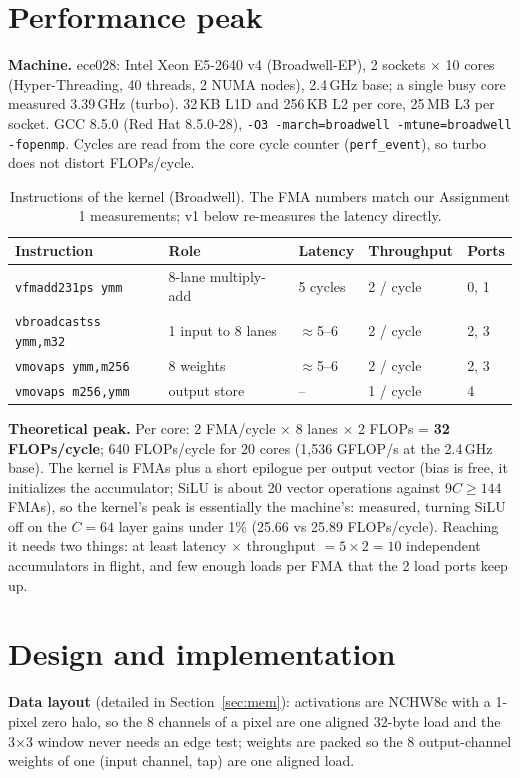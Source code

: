 \documentclass[10pt]{article}
\newcommand{\code}[1]{\texttt{#1}}
\begin{document}
\section{Performance peak}
\textbf{Machine.} ece028: Intel Xeon E5-2640 v4 (Broadwell-EP), 2 sockets $\times$ 10 cores (Hyper-Threading, 40 threads, 2 NUMA nodes), 2.4\,GHz base; a single busy core measured 3.39\,GHz (turbo). 32\,KB L1D and 256\,KB L2 per core, 25\,MB L3 per socket. GCC 8.5.0 (Red Hat 8.5.0-28), \code{-O3 -march=broadwell -mtune=broadwell -fopenmp}. Cycles are read from the core cycle counter (\code{perf\_event}), so turbo does not distort FLOPs/cycle.

\begin{table}[H]\centering\small
\begin{tabular}{lllll}
\toprule
Instruction & Role & Latency & Throughput & Ports\\
\midrule
\code{vfmadd231ps ymm} & 8-lane multiply-add & 5 cycles & 2 / cycle & 0, 1\\
\code{vbroadcastss ymm,m32} & 1 input to 8 lanes & $\approx$5--6 & 2 / cycle & 2, 3\\
\code{vmovaps ymm,m256} & 8 weights & $\approx$5--6 & 2 / cycle & 2, 3\\
\code{vmovaps m256,ymm} & output store & -- & 1 / cycle & 4\\
\bottomrule
\end{tabular}
\caption{Instructions of the kernel (Broadwell). The FMA numbers match our Assignment 1 measurements; v1 below re-measures the latency directly.}
\end{table}

\textbf{Theoretical peak.} Per core: 2 FMA/cycle $\times$ 8 lanes $\times$ 2 FLOPs = \textbf{32 FLOPs/cycle}; 640 FLOPs/cycle for 20 cores (1{,}536 GFLOP/s at the 2.4\,GHz base). The kernel is FMAs plus a short epilogue per output vector (bias is free, it initializes the accumulator; SiLU is about 20 vector operations against $9C\ge144$ FMAs), so the kernel's peak is essentially the machine's: measured, turning SiLU off on the $C=64$ layer gains under 1\% (25.66 vs 25.89 FLOPs/cycle). Reaching it needs two things: at least latency $\times$ throughput $= 5 \times 2 = 10$ independent accumulators in flight, and few enough loads per FMA that the 2 load ports keep up.

\section{Design and implementation}
\textbf{Data layout} (detailed in Section~\ref{sec:mem}): activations are NCHW8c with a 1-pixel zero halo, so the 8 channels of a pixel are one aligned 32-byte load and the 3$\times$3 window never needs an edge test; weights are packed so the 8 output-channel weights of one (input channel, tap) are one aligned load.
\end{document}
